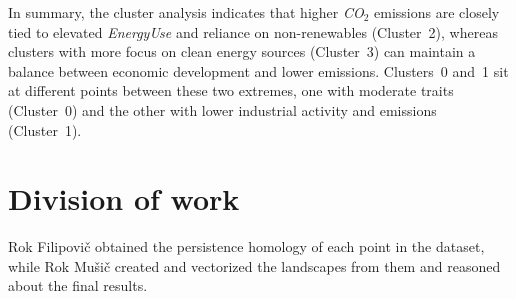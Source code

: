 \documentclass{article}
\begin{document}
In summary, the cluster analysis indicates that higher \textit{CO$_2$} emissions are closely tied to elevated \textit{EnergyUse} and reliance on non-renewables (Cluster~2), whereas clusters with more focus on clean energy sources (Cluster~3) can maintain a balance between economic development and lower emissions. Clusters~0 and~1 sit at different points between these two extremes, one with moderate traits (Cluster~0) and the other with lower industrial activity and emissions (Cluster~1).

\section*{Division of work}

Rok Filipovič obtained the persistence homology of each point in the dataset, while Rok Mušič created and vectorized the landscapes from them and reasoned about the final results.



\end{document}
